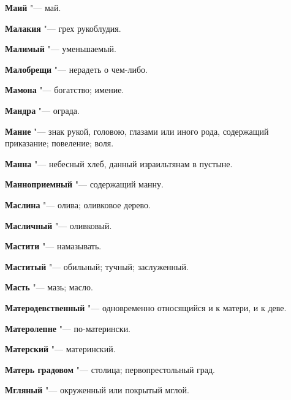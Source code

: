 \begin{mymulticols}{2}
\noindent\textbf{Маий} "--- май. 




\noindent\textbf{Малакия} "--- грех рукоблудия. 




\noindent\textbf{Малимый} "--- уменьшаемый. 




\noindent\textbf{Малобрещи} "--- нерадеть о чем-либо. 




\noindent\textbf{Мамона} "--- богатство; имение. 




\noindent\textbf{Мандра} "--- ограда. 




\noindent\textbf{Мание} "--- знак рукой, головою, глазами или иного рода, содержащий приказание; повеление; воля. 




\noindent\textbf{Манна} "--- небесный хлеб, данный израильтянам в пустыне. 




\noindent\textbf{Манноприемный} "--- содержащий манну. 




\noindent\textbf{Маслина} "--- олива; оливковое дерево. 




\noindent\textbf{Масличный} "--- оливковый. 




\noindent\textbf{Мастити} "--- намазывать. 




\noindent\textbf{Маститый} "--- обильный; тучный; заслуженный. 




\noindent\textbf{Масть} "--- мазь; масло. 




\noindent\textbf{Матеродевственный} "--- одновременно относящийся и к матери, и к деве. 




\noindent\textbf{Матеролепне} "--- по-матерински. 




\noindent\textbf{Матерский} "--- материнский. 




\noindent\textbf{Матерь градовом} "--- столица; первопрестольный град. 




\noindent\textbf{Мгляный} "--- окруженный или покрытый мглой. 





\end{mymulticols}
